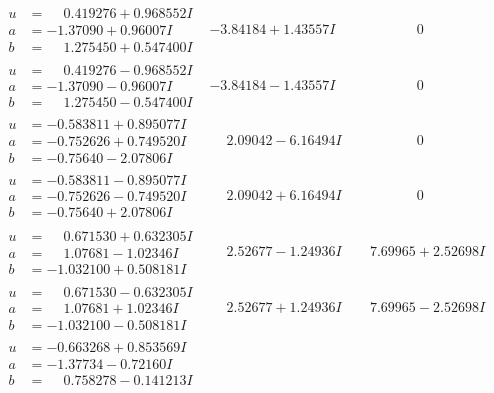 \documentclass[1p]{elsarticle_modified}
\theoremstyle{definition}
\begin{document}
$$\begin{array}{c|c|c}
\begin{aligned}
u &= \phantom{-}0.419276 + 0.968552 I \\
a &= -1.37090 + 0.96007 I \\
b &= \phantom{-}1.275450 + 0.547400 I\end{aligned}
 & -3.84184 + 1.43557 I & \phantom{-0.000000 } 0 \\ \hline\begin{aligned}
u &= \phantom{-}0.419276 - 0.968552 I \\
a &= -1.37090 - 0.96007 I \\
b &= \phantom{-}1.275450 - 0.547400 I\end{aligned}
 & -3.84184 - 1.43557 I & \phantom{-0.000000 } 0 \\ \hline\begin{aligned}
u &= -0.583811 + 0.895077 I \\
a &= -0.752626 + 0.749520 I \\
b &= -0.75640 - 2.07806 I\end{aligned}
 & \phantom{-}2.09042 - 6.16494 I & \phantom{-0.000000 } 0 \\ \hline\begin{aligned}
u &= -0.583811 - 0.895077 I \\
a &= -0.752626 - 0.749520 I \\
b &= -0.75640 + 2.07806 I\end{aligned}
 & \phantom{-}2.09042 + 6.16494 I & \phantom{-0.000000 } 0 \\ \hline\begin{aligned}
u &= \phantom{-}0.671530 + 0.632305 I \\
a &= \phantom{-}1.07681 - 1.02346 I \\
b &= -1.032100 + 0.508181 I\end{aligned}
 & \phantom{-}2.52677 - 1.24936 I & \phantom{-}7.69965 + 2.52698 I \\ \hline\begin{aligned}
u &= \phantom{-}0.671530 - 0.632305 I \\
a &= \phantom{-}1.07681 + 1.02346 I \\
b &= -1.032100 - 0.508181 I\end{aligned}
 & \phantom{-}2.52677 + 1.24936 I & \phantom{-}7.69965 - 2.52698 I \\ \hline\begin{aligned}
u &= -0.663268 + 0.853569 I \\
a &= -1.37734 - 0.72160 I \\
b &= \phantom{-}0.758278 - 0.141213 I\end{aligned}

\end{array}$$
\end{document}
